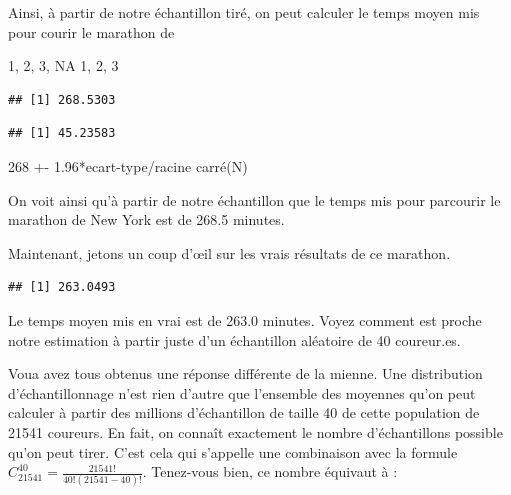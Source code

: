 \documentclass[
]{article}
\newenvironment{Shaded}{\begin{snugshade}}{\end{snugshade}}
\newcommand{\AttributeTok}[1]{\textcolor[rgb]{0.77,0.63,0.00}{#1}}
\newcommand{\ConstantTok}[1]{\textcolor[rgb]{0.00,0.00,0.00}{#1}}
\newcommand{\FunctionTok}[1]{\textcolor[rgb]{0.00,0.00,0.00}{#1}}
\newcommand{\NormalTok}[1]{#1}
\newcommand{\OtherTok}[1]{\textcolor[rgb]{0.56,0.35,0.01}{#1}}
\newcommand{\SpecialCharTok}[1]{\textcolor[rgb]{0.00,0.00,0.00}{#1}}
\begin{document}
Ainsi, à partir de notre échantillon tiré, on peut calculer le temps
moyen mis pour courir le marathon de

1, 2, 3, NA 1, 2, 3

\begin{Shaded}
\end{Shaded}

\begin{verbatim}
## [1] 268.5303
\end{verbatim}

\begin{Shaded}
\end{Shaded}

\begin{verbatim}
## [1] 45.23583
\end{verbatim}

268 +- 1.96*ecart-type/racine carré(N)

On voit ainsi qu'à partir de notre échantillon que le temps mis pour
parcourir le marathon de New York est de 268.5 minutes.

Maintenant, jetons un coup d'œil sur les vrais résultats de ce marathon.

\begin{Shaded}
\end{Shaded}

\begin{verbatim}
## [1] 263.0493
\end{verbatim}

Le temps moyen mis en vrai est de 263.0 minutes. Voyez comment est
proche notre estimation à partir juste d'un échantillon aléatoire de 40
coureur.es.

Voua avez tous obtenus une réponse différente de la mienne. Une
distribution d'échantillonnage n'est rien d'autre que l'ensemble des
moyennes qu'on peut calculer à partir des millions d'échantillon de
taille 40 de cette population de 21541 coureurs. En fait, on connaît
exactement le nombre d'échantillons possible qu'on peut tirer. C'est
cela qui s'appelle une combinaison avec la formule
\(C_{21541}^{40} =\frac{21541!}{40!(21541 - 40)!}\). Tenez-vous bien, ce
nombre équivaut à :
\end{document}
